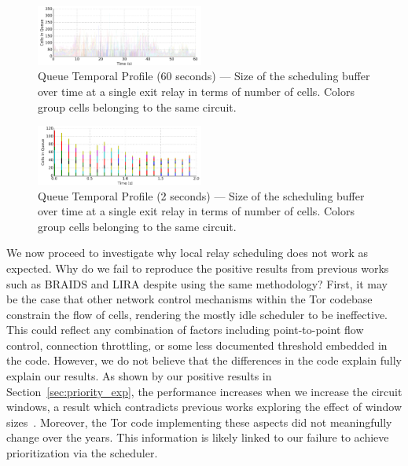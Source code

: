 \begin{figure} \centering
  \includegraphics[width=0.49\textwidth]{images/scheduling_far.png}
  \caption[Queue Temporal Profile (60 seconds)]{Queue Temporal Profile (60
    seconds) --- Size of the scheduling buffer over time at a single exit relay
    in terms of number of cells. Colors group cells belonging to the same
    circuit.}
  \label{fig:scheduling_far}
\end{figure}

\begin{figure} \centering
  \includegraphics[width=0.49\textwidth]{images/scheduling_close.png}
  \caption[Queue Temporal Profile (2 seconds)]{Queue Temporal Profile (2
    seconds) --- Size of the scheduling buffer over time at a single exit relay
    in terms of number of cells. Colors group cells belonging to the same
    circuit.}
  \label{fig:scheduling_close}
\end{figure}


We now proceed to investigate why local relay scheduling does not work as expected.
Why do we fail to reproduce the positive results from previous works such as BRAIDS and LIRA despite using the same methodology?
First, it may be the case that other network control mechanisms within the Tor codebase constrain the flow of cells, rendering the mostly idle scheduler to be ineffective.
This could reflect any combination of factors including point-to-point flow control, connection throttling, or some less documented threshold embedded in the code.
However, we do not believe that the differences in the code explain fully explain our results.
As shown by our positive results in Section~\ref{sec:priority_exp}, the performance increases when we increase the circuit windows, a result which contradicts previous works exploring the effect of window sizes~\cite{archive-2009-mail, kiraly2008solving, dingledine2009performance}.
Moreover, the Tor code implementing these aspects did not meaningfully change over the years.
This information is likely linked to our failure to achieve prioritization via the scheduler.

